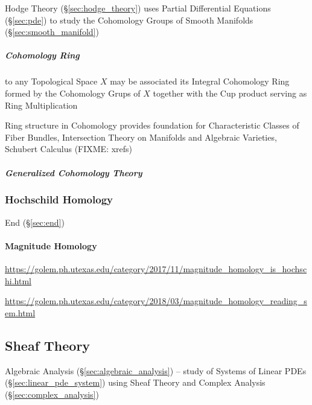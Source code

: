 \fist Hodge Theory (\S\ref{sec:hodge_theory}) uses Partial Differential
Equations (\S\ref{sec:pde}) to study the Cohomology Groups of Smooth Manifolds
(\S\ref{sec:smooth_manifold})



\subparagraph{Cohomology Ring}\label{sec:cohomology_ring}\hfill

to any Topological Space $X$ may be associated its Integral Cohomology Ring
formed by the Cohomology Grups of $X$ together with the Cup product serving as
Ring Multiplication

Ring structure in Cohomology provides foundation for Characteristic Classes of
Fiber Bundles, Intersection Theory on Manifolds and Algebraic Varieties,
Schubert Calculus (FIXME: xrefs)



\subparagraph{Generalized Cohomology Theory}
\label{sec:generalized_cohomology_theory}\hfill



\subsubsection{Hochschild Homology}\label{sec:hochschild_homology}

End (\S\ref{sec:end})



\paragraph{Magnitude Homology}\label{sec:magnitude_homology}\hfill

\url{https://golem.ph.utexas.edu/category/2017/11/magnitude_homology_is_hochschi.html}

\url{https://golem.ph.utexas.edu/category/2018/03/magnitude_homology_reading_sem.html}



\subsection{Sheaf Theory}\label{sec:sheaf_theory}

\fist Algebraic Analysis (\S\ref{sec:algebraic_analysis}) -- study of Systems of
Linear PDEs (\S\ref{sec:linear_pde_system}) using Sheaf Theory and Complex
Analysis (\S\ref{sec:complex_analysis})

